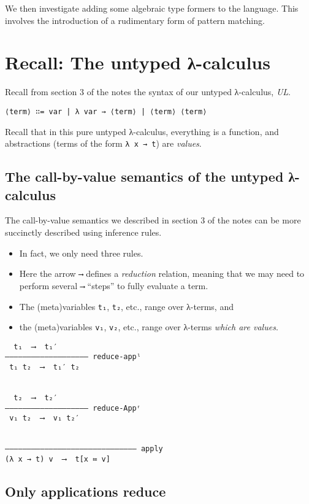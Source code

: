 \documentclass[11pt]{article}
\theoremstyle{definition}
\begin{document}
We then investigate adding some
algebraic type formers to the language.
This involves the introduction of a rudimentary form
of pattern matching.

\section{Recall: The untyped λ-calculus}
\label{sec:org611891e}

Recall from section 3 of the notes the syntax
of our untyped λ-calculus, \emph{UL}.
\begin{verbatim}
⟨term⟩ ∷= var | λ var → ⟨term⟩ | ⟨term⟩ ⟨term⟩
\end{verbatim}

Recall that in this pure untyped λ-calculus,
everything is a function, and abstractions
(terms of the form \texttt{λ x → t}) are \emph{values}.

\subsection{The call-by-value semantics of the untyped λ-calculus}
\label{sec:org8344f43}

The call-by-value semantics we described in section 3 of the notes
can be more succinctly described using inference rules.
\begin{itemize}
\item In fact, we only need three rules.

\item Here the arrow \texttt{⟶} defines a \emph{reduction} relation,
meaning that we may need to perform several \texttt{⟶} “steps” to fully
evaluate a term.
\item The (meta)variables \texttt{t₁}, \texttt{t₂}, etc., range over λ-terms, and
\item the (meta)variables \texttt{v₁}, \texttt{v₂}, etc., range over λ-terms \emph{which are values}.
\end{itemize}
\begin{verbatim}
  t₁  ⟶  t₁′
––––––––––––––––––– reduce-appˡ
 t₁ t₂  ⟶  t₁′ t₂

 
  t₂  ⟶  t₂′
––––––––––––––––––– reduce-Appʳ
 v₁ t₂  ⟶  v₁ t₂′


–––––––––––––––––––––––––––––– apply
(λ x → t) v  ⟶  t[x ≔ v]
\end{verbatim}

\subsection{Only applications reduce}
\label{sec:org9da3ba7}
\end{document}
